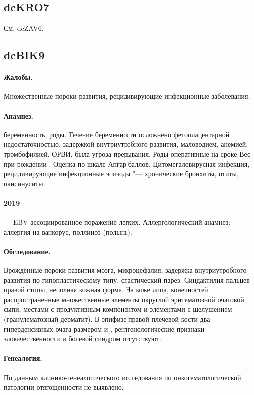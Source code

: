 \documentclass[a4paper,14pt]{extarticle}
\newcommand{\gramm}{г}
\newcommand{\cm}{см}
\newcommand{\weeks}{нед.}
\begin{document}
\subsection*{dcKRO7}

См. dcZAV6.

\subsection*{dcBIK9}

\paragraph{Жалобы.}
Множественные пороки развития, рецидивирующие инфекционные заболевания.

\paragraph{Анамнез.}
 беременность,  роды.
Течение беременности осложнено фетоплацентарной недостаточностью, задержкой внутриутробного развития, маловодием, анемией, тромбофилией, ОРВИ, была угроза прерывания.
Роды оперативные на сроке \numprint[\weeks]{38}
Вес при рождении \numprint[\gramm]{2600}.
Оценка по шкале Апгар  баллов.
Цитомегаловирусная инфекция, рецидивирующие инфекционные эпизоды "--- хронические бронхиты, отиты, пансинуситы.
\paragraph{2019} --- EBV-ассоциированное поражение легких.
Аллергологический анамнез: аллергия на ванкорус, поллиноз (полынь).

\paragraph{Обследование.}
Врождённые пороки развития мозга, микроцефалия, задержка внутриутробного развития по гипопластическому типу, спастический парез.
Синдактилия  пальцев правой стопы, неполная кожная форма.
На коже лица, конечностей распространенные множественные элементы округлой эритематозной очаговой сыпи, местами с продуктивным компонентом и элементами с шелушением (гранулематозный дерматит).
В эпифизе правой плечевой кости два гиперденсивных очага размером \numprint[\cm]{0.5} и \numprint[\cm]{0.2}, рентгенологические признаки злокачественности и болевой синдром отсутствуют.

\paragraph{Генеалогия.}
По данным клинико-генеалогического исследования по онкогематологической патологии отягощенности не выявлено.
\end{document}
